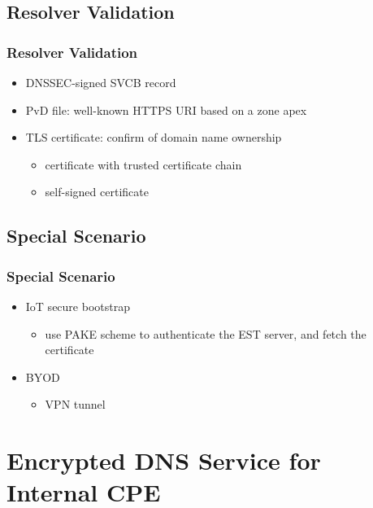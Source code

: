 \documentclass{ctexbeamer}
\begin{document}
\subsection{Resolver Validation}
\begin{frame}
\frametitle{Resolver Validation}

\begin{itemize}
    \item DNSSEC-signed SVCB record
    \item PvD file: well-known HTTPS URI based on a zone apex
    \item TLS certificate: confirm of domain name ownership
        \begin{itemize}
            \item certificate with trusted certificate chain
            \item self-signed certificate
        \end{itemize}
\end{itemize}
    \end{frame}

\subsection{Special Scenario}
\begin{frame}
\frametitle{Special Scenario}

\begin{itemize}
    \item IoT secure bootstrap
        \begin{itemize}
            \item use PAKE scheme to authenticate the EST server, and fetch the certificate
        \end{itemize}
    \item BYOD
        \begin{itemize}
        \item VPN tunnel
        \end{itemize}
\end{itemize}
    \end{frame}

\section{Encrypted DNS Service for Internal CPE}
\end{document}

